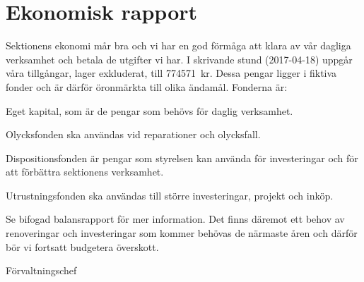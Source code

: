 \documentclass[../_main/handlingar.tex]{subfiles}
\begin{document}
\section{Ekonomisk rapport}

Sektionens ekonomi mår bra och vi har en god förmåga att klara av vår dagliga verksamhet och betala de utgifter vi har. I skrivande stund (2017-04-18) uppgår våra tillgångar, lager exkluderat, till \SI{774571}{kr}. Dessa pengar ligger i fiktiva fonder och är därför öronmärkta till olika ändamål. Fonderna är:

\begin{dashlist}
\item Eget kapital, som är de pengar som behövs för daglig verksamhet.
\item Olycksfonden ska användas vid reparationer och olycksfall.
\item Dispositionsfonden är pengar som styrelsen kan använda för investeringar och för att förbättra sektionens verksamhet.
\item Utrustningsfonden ska användas till större investeringar, projekt och inköp.
\end{dashlist}

Se bifogad balansrapport för mer information.
Det finns däremot ett behov av renoveringar och investeringar som kommer behövas de närmaste åren och därför bör vi fortsatt budgetera överskott.

\begin{signatures}{1}
    \mvh
    \signature{\fvc}{Förvaltningschef}
\end{signatures}
\end{document}
